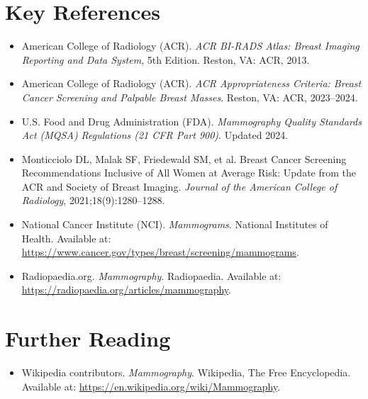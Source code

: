 \section{Key References}

\begin{itemize}
    \item American College of Radiology (ACR). \textit{ACR BI-RADS Atlas: Breast Imaging Reporting and Data System}, 5th Edition. Reston, VA: ACR, 2013.
    \item American College of Radiology (ACR). \textit{ACR Appropriateness Criteria: Breast Cancer Screening and Palpable Breast Masses}. Reston, VA: ACR, 2023--2024.
    \item U.S. Food and Drug Administration (FDA). \textit{Mammography Quality Standards Act (MQSA) Regulations (21 CFR Part 900)}. Updated 2024.
    \item Monticciolo DL, Malak SF, Friedewald SM, et al. Breast Cancer Screening Recommendations Inclusive of All Women at Average Risk: Update from the ACR and Society of Breast Imaging. \textit{Journal of the American College of Radiology}, 2021;18(9):1280--1288.
    \item National Cancer Institute (NCI). \textit{Mammograms}. National Institutes of Health. Available at: \url{https://www.cancer.gov/types/breast/screening/mammograms}.
    \item Radiopaedia.org. \textit{Mammography}. Radiopaedia. Available at: \url{https://radiopaedia.org/articles/mammography}.
\end{itemize}

\section{Further Reading}
\begin{itemize}
  \item Wikipedia contributors. \textit{Mammography}. Wikipedia, The Free Encyclopedia. Available at: \url{https://en.wikipedia.org/wiki/Mammography}.
\end{itemize}
